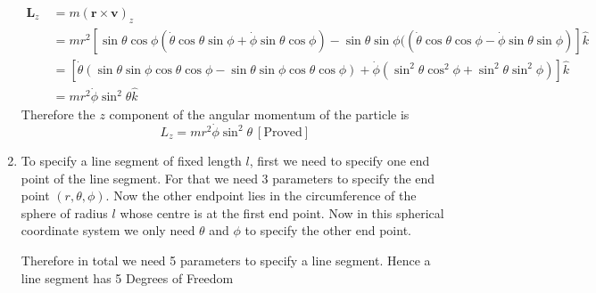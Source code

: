 \documentclass{article}
\begin{document}
\begin{enumerate}
\begin{align*}
\boldsymbol{L}_z\ &=m(\boldsymbol{r}\times\boldsymbol{v})_z\\
&=mr^2[\sin\theta\cos\phi(\dot{\theta}\cos \theta  \sin \phi+\dot{\phi}\sin \theta \cos \phi )-\sin\theta\sin\phi((\dot{\theta}\cos \theta  \cos \phi-\dot{\phi}\sin \theta \sin \phi)]\hat{k}\\
&=[\dot{\theta}(\sin\theta\sin\phi\cos\theta\cos\phi-\sin\theta\sin\phi\cos\theta\cos\phi)+\dot{\phi}(\sin^2\theta\cos^2\phi+\sin^2\theta\sin^2\phi)]\hat{k}\\
&=mr^2\dot{\phi}\sin^2\theta\hat{k}
\end{align*}Therefore the $z$ component of the angular momentum of the particle is $$L_z=mr^2\dot{\phi}\sin^2\theta\ [\text{Proved}]$$ 
\item To specify a line segment of fixed length $l$, first we need to specify one end point of the line segment. For that we need 3 parameters to specify the end point $(r,\theta,\phi).$ Now the other endpoint lies in the circumference of the sphere of radius $l$ whose centre is at the first end point. Now in this spherical coordinate system we only need $\theta$ and $\phi$ to specify the other end point.

\hspace{1cm}Therefore in total we need 5 parameters to specify a line segment. Hence a line segment has 5 Degrees of Freedom
\end{enumerate}
\end{document}
